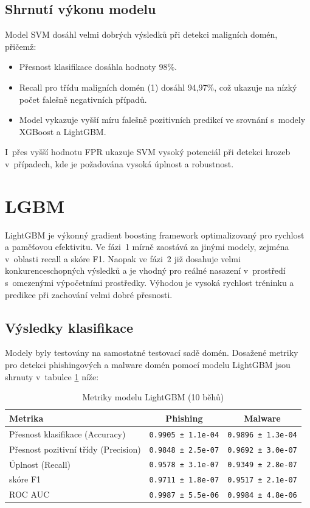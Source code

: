 \subsection{Shrnutí výkonu modelu}

Model SVM dosáhl velmi dobrých výsledků při detekci maligních domén, přičemž:
\begin{itemize}
    \item Přesnost klasifikace dosáhla hodnoty 98\%.
    \item Recall pro třídu maligních domén (1) dosáhl 94,97\%, což ukazuje na nízký počet falešně negativních případů.
    \item Model vykazuje vyšší míru falešně pozitivních predikcí ve srovnání s~modely XGBoost a LightGBM.
\end{itemize}

I~přes vyšší hodnotu FPR ukazuje SVM vysoký potenciál při detekci hrozeb v~případech, kde je požadována vysoká úplnost a robustnost.




\section{LGBM}\label{res:lgbm}
LightGBM je výkonný gradient boosting framework optimalizovaný pro rychlost a paměťovou efektivitu. Ve fázi~1 mírně zaostává za jinými modely, zejména v~oblasti recall a skóre F1. Naopak ve fázi~2 již dosahuje velmi konkurenceschopných výsledků a je vhodný pro reálné nasazení v~prostředí s~omezenými výpočetními prostředky. Výhodou je vysoká rychlost tréninku a predikce při zachování velmi dobré přesnosti.


\subsection{Výsledky klasifikace}

Modely byly testovány na samostatné testovací sadě domén. Dosažené metriky pro detekci phishingových a malware domén pomocí modelu LightGBM jsou shrnuty v~tabulce \ref{tab:lgbm_malware_phishing_results} níže:

\begin{table}[H]
\centering
\begin{tabular}{|l|c|c|}
\hline
\textbf{Metrika} & \textbf{Phishing} & \textbf{Malware} \\
\hline
Přesnost klasifikace (Accuracy) & \texttt{0.9905 ± 1.1e-04} & \texttt{0.9896 ± 1.3e-04} \\
Přesnost pozitivní třídy (Precision) & \texttt{0.9848 ± 2.5e-07} & \texttt{0.9692 ± 3.0e-07} \\
Úplnost (Recall) & \texttt{0.9578 ± 3.1e-07} & \texttt{0.9349 ± 2.8e-07} \\
skóre F1 & \texttt{0.9711 ± 1.8e-07} & \texttt{0.9517 ± 2.1e-07} \\
ROC AUC & \texttt{0.9987 ± 5.5e-06} & \texttt{0.9984 ± 4.8e-06} \\
\hline
\end{tabular}
\caption{Metriky modelu LightGBM (10 běhů)}
\label{tab:lgbm_malware_phishing_results}
\end{table}

